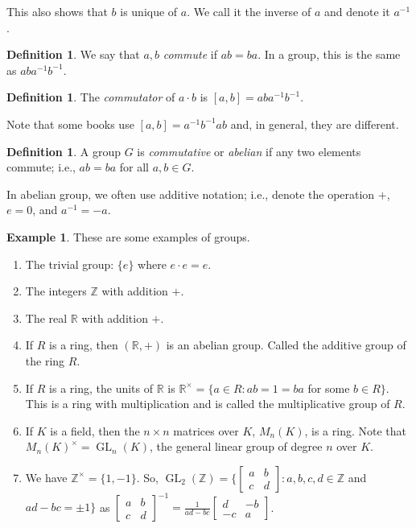 \documentclass{amsart}
\theoremstyle{definition}
\newtheorem{definition}[thm]{Definition}
\newtheorem{example}[thm]{Example}
\newcommand{\R}{\mathbb R}
\newcommand{\Z}{\mathbb Z}
\DeclareMathOperator{\GL}{GL}
\begin{document}
This also shows that $b$ is unique of $a$. We call it the inverse of $a$ and denote it $a^{-1}$. 
\begin{definition}
	We say that $a,b$ \emph{commute} if $ab=ba$. In a group, this is the same as $aba^{-1}b^{-1}$.
\end{definition}
\begin{definition}
	The \emph{commutator} of $a\cdot b$ is $[a,b]=aba^{-1}b^{-1}$.
	
	Note that some books use $[a,b]=a^{-1}b^{-1}ab$ and, in general, they are different.
\end{definition}
\begin{definition}
	A group $G$ is \emph{commutative} or \emph{abelian} if any two elements commute; i.e., $ab=ba$ for all $a,b\in G$.
\end{definition}
In abelian group, we often use additive notation; i.e., denote the operation $+$, $e=0$, and $a^{-1}=-a$.
\begin{example}
	These are some examples of groups.
	\begin{enumerate}
		\item The trivial group: $\{e\}$ where $e\cdot e=e$.
		\item The integers $\Z$ with addition $+$.
		\item The real $\R$ with addition $+$.
		\item If $R$ is a ring, then $(\R,+)$ is an abelian group. Called the additive group of the ring $R$.
		\item If $R$ is a ring, the units of $\R$ is $\R^\times=\{a\in R: ab=1=ba$ for some $b\in R\}$. This is a ring with multiplication and is called the multiplicative group of $R$.
		\item If $K$ is a field, then the $n\times n$ matrices over $K$, $M_n(K)$, is a ring. Note that $M_n(K)^\times=\GL_n(K)$, the general linear group of degree $n$ over $K$.
		\item We have $\Z^\times=\{1,-1\}$. So, $\GL_2(\Z)=\{\begin{bmatrix}
			a&b\\c&d
		\end{bmatrix}:a,b,c,d\in\Z$ and $ad-bc=\pm 1\}$ as $\begin{bmatrix}
			a&b\\c&d
		\end{bmatrix}^{-1}=\frac{1}{ad-bc}\begin{bmatrix}
			d&-b\\-c&a
		\end{bmatrix}$.
	\end{enumerate}
\end{example}
\end{document}

